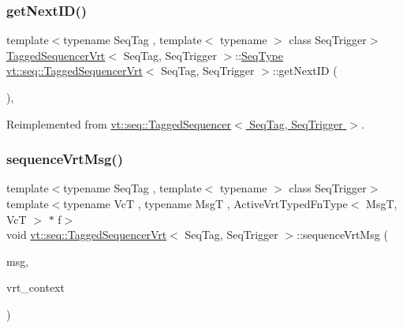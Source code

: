 \subsubsection{\texorpdfstring{get\+Next\+I\+D()}{getNextID()}}
{\footnotesize\ttfamily template$<$typename Seq\+Tag , template$<$ typename $>$ class Seq\+Trigger$>$ \\
\hyperlink{structvt_1_1seq_1_1_tagged_sequencer_vrt}{Tagged\+Sequencer\+Vrt}$<$ Seq\+Tag, Seq\+Trigger $>$\+::\hyperlink{structvt_1_1seq_1_1_tagged_sequencer_a1c8ee839258d0f88c49ef660267a81d5}{Seq\+Type} \hyperlink{structvt_1_1seq_1_1_tagged_sequencer_vrt}{vt\+::seq\+::\+Tagged\+Sequencer\+Vrt}$<$ Seq\+Tag, Seq\+Trigger $>$\+::get\+Next\+ID (\begin{DoxyParamCaption}{ }\end{DoxyParamCaption})\hspace{0.3cm}{\ttfamily [override]}, {\ttfamily [virtual]}}



Reimplemented from \hyperlink{structvt_1_1seq_1_1_tagged_sequencer_a243149e1efcc57ae08fb265b09ef9a60}{vt\+::seq\+::\+Tagged\+Sequencer$<$ Seq\+Tag, Seq\+Trigger $>$}.

\mbox{\label{structvt_1_1seq_1_1_tagged_sequencer_vrt_aae7a0943397b44e3f43160008e2b8d42}} 
\subsubsection{\texorpdfstring{sequence\+Vrt\+Msg()}{sequenceVrtMsg()}}
{\footnotesize\ttfamily template$<$typename Seq\+Tag , template$<$ typename $>$ class Seq\+Trigger$>$ \\
template$<$typename VcT , typename MsgT , Active\+Vrt\+Typed\+Fn\+Type$<$ Msg\+T, Vc\+T $>$ $\ast$ f$>$ \\
void \hyperlink{structvt_1_1seq_1_1_tagged_sequencer_vrt}{vt\+::seq\+::\+Tagged\+Sequencer\+Vrt}$<$ Seq\+Tag, Seq\+Trigger $>$\+::sequence\+Vrt\+Msg (\begin{DoxyParamCaption}\item[{MsgT $\ast$}]{msg,  }\item[{VcT $\ast$}]{vrt\+\_\+context }\end{DoxyParamCaption})}

